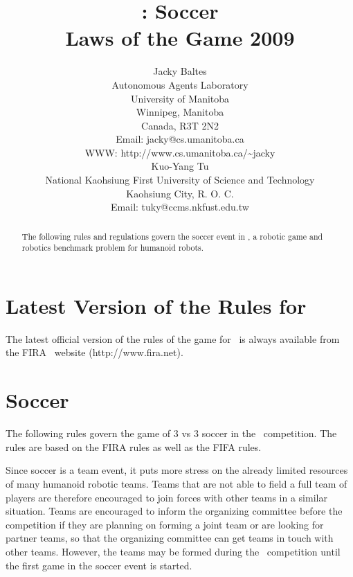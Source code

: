 \documentclass[12pt]{hurocup}
\begin{document}
\title{\HuroCup: Soccer\\
Laws of the Game 2009}

\author{Jacky Baltes\\
Autonomous Agents Laboratory\\
University of Manitoba\\
Winnipeg, Manitoba\\
Canada, R3T 2N2\\
Email: jacky@cs.umanitoba.ca\\
WWW: http://www.cs.umanitoba.ca/\~{ }jacky\\[5mm]
Kuo-Yang Tu\\
National Kaohsiung First University of Science and Technology\\
Kaohsiung City, R. O. C.\\
Email: tuky@ccms.nkfust.edu.tw\\
}

\maketitle
\begin{abstract}
The following rules and regulations govern the soccer event in
\HuroCup, a robotic game and robotics benchmark problem for humanoid
robots.
%
\end{abstract}

\section*{Latest Version of the Rules for \HuroCup}
\label{sec:updates}

The latest official version of the rules of the game for \HuroCup\ is
always available from the FIRA \HuroCup\ website (http://www.fira.net).

\newpage

\section{Soccer}
\label{sec:soccer}

The following rules govern the game of 3 vs 3 soccer in the \HuroCup\
competition. The rules are based on the FIRA rules as well as the FIFA
rules.

Since soccer is a team event, it puts more stress on the already
limited resources of many humanoid robotic teams. Teams that are not
able to field a full team of players are therefore encouraged to join
forces with other teams in a similar situation. Teams are encouraged
to inform the organizing committee before the competition if they are
planning on forming a joint team or are looking for partner teams, so
that the organizing committee can get teams in touch with other
teams. However, the teams may be formed during the \HuroCup\
competition until the first game in the soccer event is started.
\end{document}
